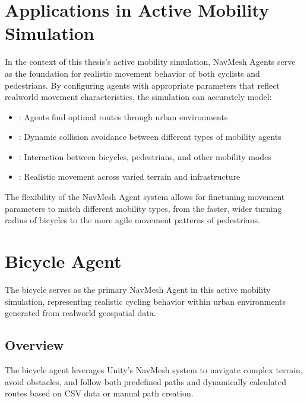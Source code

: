 \documentclass[letterpaper,10pt,english]{jupyterBook}
\begin{document}
\section{Applications in Active Mobility Simulation}
\label{\detokenize{Navmesh Agent:applications-in-active-mobility-simulation}}
\sphinxAtStartPar
In the context of this thesis’s active mobility simulation, NavMesh Agents serve as the foundation for realistic movement behavior of both cyclists and pedestrians. By configuring agents with appropriate parameters that reflect real\sphinxhyphen{}world movement characteristics, the simulation can accurately model:
\begin{itemize}
\item {} 
\sphinxAtStartPar
{}: Agents find optimal routes through urban environments

\item {} 
\sphinxAtStartPar
{}: Dynamic collision avoidance between different types of mobility agents

\item {} 
\sphinxAtStartPar
{}: Interaction between bicycles, pedestrians, and other mobility modes

\item {} 
\sphinxAtStartPar
{}: Realistic movement across varied terrain and infrastructure

\end{itemize}

\sphinxAtStartPar
The flexibility of the NavMesh Agent system allows for fine\sphinxhyphen{}tuning movement parameters to match different mobility types, from the faster, wider turning radius of bicycles to the more agile movement patterns of pedestrians.

\sphinxstepscope


\section{Bicycle Agent}
\label{\detokenize{Bicycle Agent:bicycle-agent}}\label{\detokenize{Bicycle Agent::doc}}
\sphinxAtStartPar
The bicycle serves as the primary NavMesh Agent in this active mobility simulation, representing realistic cycling behavior within urban environments generated from real\sphinxhyphen{}world geospatial data.


\subsection{Overview}
\label{\detokenize{Bicycle Agent:overview}}
\sphinxAtStartPar
The bicycle agent leverages Unity’s NavMesh system to navigate complex terrain, avoid obstacles, and follow both predefined paths and dynamically calculated routes based on CSV data or manual path creation.
\end{document}
